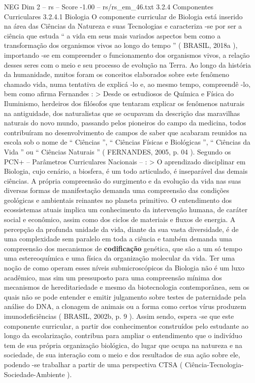 \begin{textsample}{NEG Dim 2 – rs – Score -1.00 – rs/rs\_em\_46.txt}  \label{ex:f2_neg_214}
3.2.4 Componentes Curriculares 3.2.4.1 Biologia O componente curricular de Biologia está inserido na área das Ciências da Natureza e suas Tecnologias e caracteriza -se por ser a ciência que estuda “ a vida em seus mais variados aspectos bem como a transformação dos organismos vivos ao longo do tempo ” ( BRASIL, 2018a ), importando -se em compreender o funcionamento dos organismos vivos, a relação desses seres com o meio e seu processo de evolução na Terra.
Ao longo da história da humanidade, muitos foram os conceitos elaborados sobre este fenômeno chamado vida, numa tentativa de explicá -lo e, ao mesmo tempo, compreendê -lo, bem como afirma Fernandes : > Desde os estudiosos de Química e Física do Iluminismo, herdeiros dos filósofos que tentaram explicar os fenômenos naturais na antiguidade, dos naturalistas que se ocupavam da descrição das maravilhas naturais do novo mundo, passando pelos pioneiros do campo da medicina, todos contribuíram no desenvolvimento de campos de saber que acabaram reunidos na escola sob o nome de “ Ciências ”, “ Ciências Físicas e Biológicas ”, “ Ciências da Vida ” ou “ Ciências Naturais ” ( FERNANDES, 2005, p. 04 ).
Segundo os PCN+ – Parâmetros Curriculares Nacionais – : > O aprendizado disciplinar em Biologia, cujo cenário, a biosfera, é um todo articulado, é inseparável das demais ciências.
A própria compreensão do surgimento e da evolução da vida nas suas diversas formas de manifestação demanda uma compreensão das condições geológicas e ambientais reinantes no planeta primitivo.
O entendimento dos ecossistemas atuais implica um conhecimento da intervenção humana, de caráter social e econômico, assim como dos ciclos de materiais e fluxos de energia.
A percepção da profunda unidade da vida, diante da sua vasta diversidade, é de uma complexidade sem paralelo em toda a ciência e também demanda uma compreensão dos mecanismos de \textbf{codificação} genética, que são a um só tempo uma estereoquímica e uma física da organização molecular da vida.
Ter uma noção de como operam esses níveis submicroscópicos da Biologia não é um luxo acadêmico, mas sim um pressuposto para uma compreensão mínima dos mecanismos de hereditariedade e mesmo da biotecnologia contemporânea, sem os quais não se pode entender e emitir julgamento sobre testes de paternidade pela análise do DNA, a clonagem de animais ou a forma como certos vírus produzem imunodeficiências ( BRASIL, 2002b, p. 9 ).
Assim sendo, espera -se que este componente curricular, a partir dos conhecimentos construídos pelo estudante ao longo da escolarização, contribua para ampliar o entendimento que o indivíduo tem de sua própria organização biológica, do lugar que ocupa na natureza e na sociedade, de sua interação com o meio e dos resultados de sua ação sobre ele, podendo -se trabalhar a partir de uma perspectiva CTSA ( Ciência-Tecnologia-Sociedade-Ambiente ).

\end{textsample}
